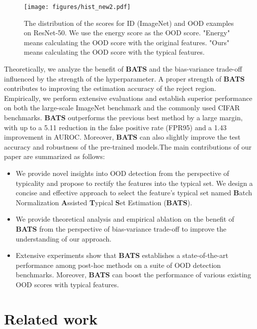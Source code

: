 \documentclass{article}
\begin{document}
\begin{figure}[htbp]
\centering
\texttt{[image: figures/hist\_new2.pdf]}
\vspace{-0.4cm}
\caption{The distribution of the scores for ID (ImageNet) and OOD examples on ResNet-50. We use the energy score \cite{liu2020energy} as the OOD score. "Energy" means calculating the OOD score with the original features. "Ours" means calculating the OOD score with the typical features.}
\label{img:hist}
\end{figure}

Theoretically, we analyze the benefit of \textbf{BATS} and the bias-variance trade-off influenced by the strength of the hyperparameter. A proper strength of \textbf{BATS} contributes to improving the estimation accuracy of the reject region. Empirically, we perform extensive evaluations and establish superior performance on both the large-scale ImageNet benchmark and the commonly used CIFAR benchmarks. \textbf{BATS} outperforms the previous best method by a large margin, with up to a 5.11 reduction in the false positive rate (FPR95) and a 1.43 improvement in AUROC. Moreover, \textbf{BATS} can also slightly improve the test accuracy and robustness of the pre-trained models.The main contributions of our paper are summarized as follows:
 \begin{itemize}
 \item[] We provide novel insights into OOD detection from the perspective of typicality and propose to rectify the features into the typical set. We design a concise and effective approach to select the feature's typical set named \textbf{B}atch Normalization \textbf{A}ssisted \textbf{T}ypical \textbf{S}et Estimation (\textbf{BATS}). 
 \item[] We provide theoretical analysis and empirical ablation on the benefit of \textbf{BATS} from the perspective of bias-variance trade-off to improve the understanding of our approach.
 \item[] Extensive experiments show that \textbf{BATS} establishes a state-of-the-art performance among post-hoc methods on a suite of OOD detection benchmarks. Moreover, \textbf{BATS} can boost the performance of various existing OOD scores with typical features.
 \end{itemize}


\section{Related work}
\end{document}
